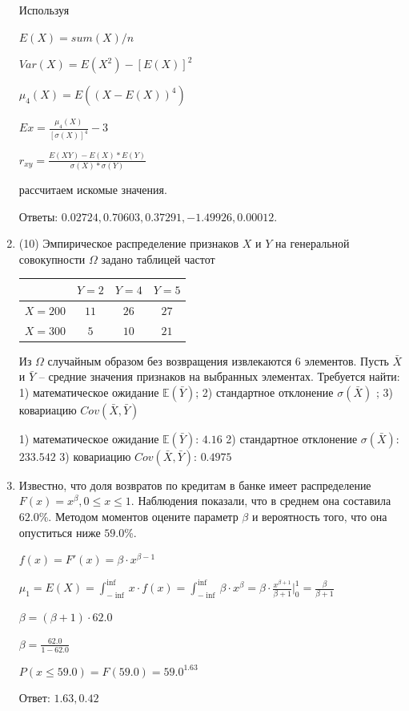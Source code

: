 \documentclass[a4paper,14pt]{article}
\begin{document}
\begin{enumerate}
    
    Используя

	$E(X) = sum(X) / n$

	$Var(X) = E(X^2) - [E(X)]^2$

	$\mu_4(X) = E((X-E(X))^4)$

	$Ex = \frac{\mu_4(X)}{[\sigma(X)]^4} - 3$

	$r_{xy} = \frac{E(XY) - E(X) * E(Y)}{\sigma(X) * \sigma(Y)}$

    рассчитаем искомые значения.

    Ответы: $0.02724, 0.70603, 0.37291, -1.49926, 0.00012$.

    

\item


(10) Эмпирическое распределение признаков $X$ и $Y$ на генеральной совокупности $\Omega$ задано таблицей частот  
 
\begin{tabular}{ | c | c | c | c | }
\hline
 & $Y = 2$ & $Y = 4$ & $Y = 5$  \\ \hline
$X = 200$ & $11$ & $26$ & $27$\\ \hline
$X = 300$ & $5$ & $10$ & $21$\\
\hline
\end{tabular}

Из $\Omega$ случайным образом без возвращения извлекаются $6$ элементов. 
Пусть $\bar X$ и $\bar Y$ – средние значения признаков на выбранных элементах. 
Требуется найти: 1) математическое ожидание $\mathbb{E}(\bar Y)$; 2) стандартное отклонение $\sigma(\bar X)$ ; 
3) ковариацию $Cov(\bar X, \bar Y)$




1) математическое ожидание $\mathbb{E}(\bar Y)$: $4.16$ 
2) стандартное отклонение $\sigma(\bar X)$: $233.542$
3) ковариацию $Cov(\bar X, \bar Y)$: $0.4975$


\item

    
	Известно, что доля возвратов по кредитам в банке имеет распределение $F(x) = x^{\beta}, 0 \le x \le 1$. Наблюдения показали, что в среднем она составила $62.0$\%. Методом моментов оцените параметр $\beta$ и вероятность того, что она опуститься ниже $59.0$\%.
	


	

	$f(x) = F'(x) = \beta \cdot x^{\beta - 1}$

	$\mu_{1} = E(X) = \int_{-\inf}^{\inf}x \cdot f(x) = \int_{-\inf}^{\inf} \beta \cdot x^{\beta} = \beta \cdot \frac{x^{\beta + 1}}{\beta + 1}\bigg|_0^1 = \frac{\beta}{\beta + 1}$

	$\beta = (\beta + 1) \cdot 62.0$

	$\beta = \frac{62.0}{1 - 62.0}$

	$ P(x \le 59.0) = F(59.0) = 59.0^{1.63} $

    Ответ: $1.63, 0.42$
	

\end{enumerate}
\end{document}
